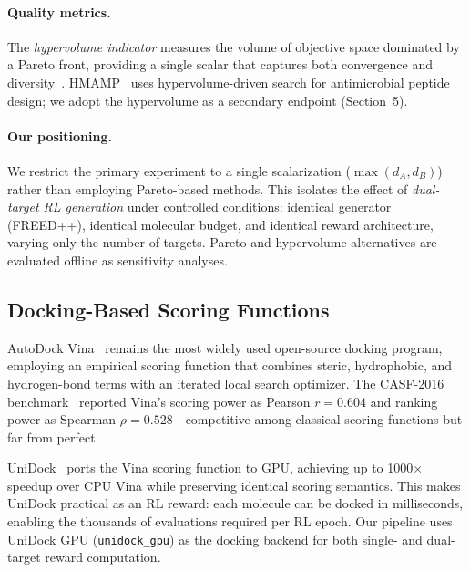 \paragraph{Quality metrics.}
The \emph{hypervolume indicator} measures the volume of objective space
dominated by a Pareto front, providing a single scalar that captures both
convergence and diversity~\citep{verhellen2022hypervolume}.
HMAMP~\citep{wang2025hmamp} uses hypervolume-driven search for
antimicrobial peptide design; we adopt the hypervolume as a secondary
endpoint (Section~5).

\paragraph{Our positioning.}
We restrict the primary experiment to a single scalarization
($\max(d_A, d_B)$) rather than employing Pareto-based methods.  This isolates the effect of \emph{dual-target RL generation}
under controlled conditions: identical generator (FREED++), identical
molecular budget, and identical reward architecture, varying only the
number of targets.  Pareto and hypervolume alternatives are evaluated
offline as sensitivity analyses.

\subsection{Docking-Based Scoring Functions}
\label{sec:rw:docking}

AutoDock Vina~\citep{trott2010vina} remains the most widely used
open-source docking program, employing an empirical scoring function
that combines steric, hydrophobic, and hydrogen-bond terms with an
iterated local search optimizer.
The CASF-2016 benchmark~\citep{su2019casf2016} reported Vina's scoring
power as Pearson $r = 0.604$ and ranking power as Spearman
$\rho = 0.528$---competitive among classical scoring functions but far
from perfect.

UniDock~\citep{yu2023unidock} ports the Vina scoring function to GPU,
achieving up to 1000$\times$ speedup over CPU Vina while preserving
identical scoring semantics.
This makes UniDock practical as an RL reward: each molecule can be
docked in milliseconds, enabling the thousands of evaluations required
per RL epoch.
Our pipeline uses UniDock GPU (\texttt{unidock\_gpu}) as the docking
backend for both single- and dual-target reward computation.

